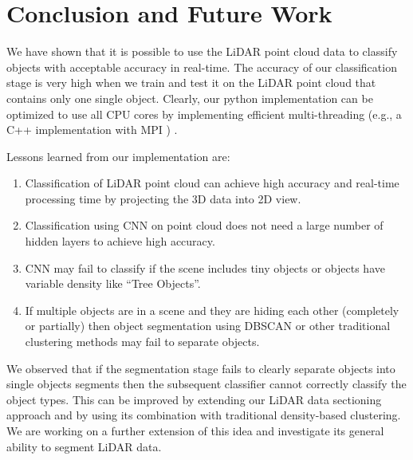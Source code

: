 \section{Conclusion and Future Work}\label{sec:conclusion}
We have shown that it is possible to use the LiDAR point cloud data to classify objects with
acceptable accuracy in real-time. The accuracy of our classification stage is very high when we train and test it on the LiDAR point cloud 
that contains only one single object. Clearly, our python implementation can be optimized to
use all CPU cores by implementing efficient multi-threading (e.g., a C++ implementation with MPI ) . 

Lessons learned from our implementation are:
\begin{enumerate}
  \item Classification of LiDAR point cloud can achieve high accuracy and real-time processing time by projecting the 3D data into 2D view.
  \item Classification using CNN on point cloud does not need a large number of hidden layers to achieve high accuracy.
  \item CNN may fail to classify if the scene includes tiny objects or objects have variable density like ``Tree Objects''.
  \item If multiple objects are in a scene and they are hiding each other (completely or partially) then object segmentation using DBSCAN 
  or other traditional clustering methods may fail to separate objects.
\end{enumerate}

We observed that if the segmentation stage fails to clearly separate objects into single objects segments then the subsequent classifier cannot correctly classify the object types. This can be improved by extending our LiDAR data sectioning approach and by using its combination with traditional density-based clustering. We are working on a further extension of this idea and investigate its general ability to segment LiDAR data.  
